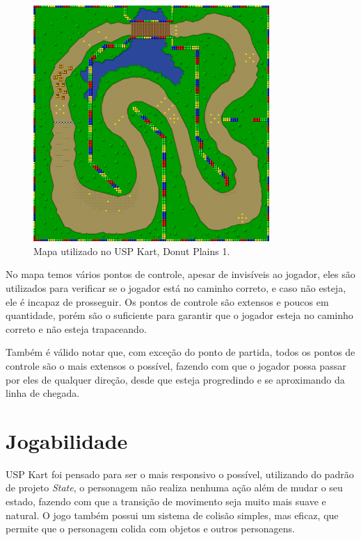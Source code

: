 \begin{figure}[H]
    \centering
    \includegraphics[width=0.8\textwidth]{figuras/Mapa.png}
    \caption{Mapa utilizado no USP Kart, Donut Plains 1. \cite{marioKart}}
    \label{fig:mapa}
\end{figure}


No mapa temos vários pontos de controle, apesar de invisíveis ao jogador, eles são utilizados para verificar se o jogador está no caminho correto, e caso não esteja, ele é incapaz de prosseguir. Os pontos de controle são extensos e poucos em quantidade, porém são o suficiente para garantir que o jogador esteja no caminho correto e não esteja trapaceando.

Também é válido notar que, com exceção do ponto de partida, todos os pontos de controle são o mais extensos o possível, fazendo com que o jogador possa passar por eles de qualquer direção, desde que esteja progredindo e se aproximando da linha de chegada.

\section{Jogabilidade}

USP Kart foi pensado para ser o mais responsivo o possível, utilizando do padrão de projeto \textit{State}, o personagem não realiza nenhuma ação além de mudar o seu estado, fazendo com que a transição de movimento seja muito mais suave e natural. O jogo também possui um sistema de colisão simples, mas eficaz, que permite que o personagem colida com objetos e outros personagens.


